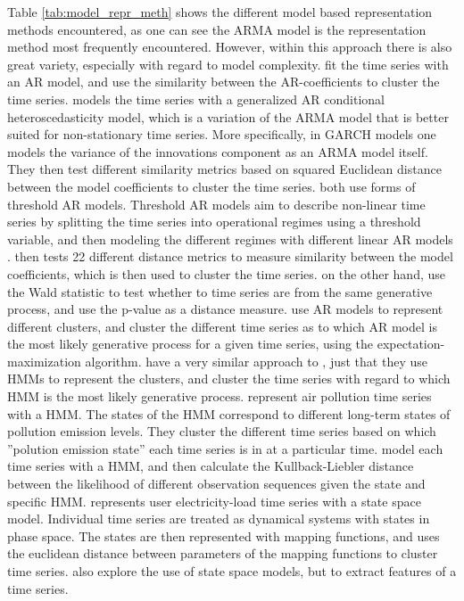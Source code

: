 Table \ref{tab:model_repr_meth} shows the different model based representation methods encountered, 
as one can see the ARMA model is the representation method most frequently encountered. 
However, within this approach there is also great variety, especially with regard to model complexity.
\textcite{shape_feat_mod_tsc_rfa, struct_damage_ar_fuzzy_c_means, ar_metric_trimmed_fuzzy_tsc_pm10, tsc_ar_metric_air_pollution} fit the time series with an AR model, and use the similarity between the AR-coefficients to cluster the time series. 
\textcite{garch_robust_tsc} models the time series with a generalized AR conditional heteroscedasticity model, which is a variation of the ARMA model that is better suited for non-stationary time series. 
More specifically, in GARCH models one models the variance of the innovations component as an ARMA model itself. 
They then test different similarity metrics based on squared Euclidean distance between the model coefficients to cluster the time series. 
\textcite{temporal_tsc_threshold_ar_models, fstar_hac_tsc} both use forms of threshold AR models. 
Threshold AR models aim to describe non-linear time series by splitting the time series into operational regimes using a threshold variable, and then modeling the different regimes with different linear AR models \cite{temporal_tsc_threshold_ar_models}. \textcite{temporal_tsc_threshold_ar_models} then tests 22 different distance metrics to measure similarity between the model coefficients, which is then used to cluster the time series. \textcite{fstar_hac_tsc} on the other hand, use the Wald statistic to test whether to time series are from the same generative process, and use the p-value as a distance measure.
\textcite{moar_mpl_tsc} use AR models to represent different clusters, and cluster the different time series as to which AR model is the most likely generative process for a given time series, using the expectation-maximization algorithm.
\textcite{mixture_gaussian_hmm} have a very similar approach to \textcite{moar_mpl_tsc}, just that they use HMMs to represent the clusters, and cluster the time series with regard to which HMM is the most likely generative process. 
\textcite{hmm_pm10_quantifying_impacts} represent air pollution time series with a HMM. 
The states of the HMM correspond to different long-term states of pollution emission levels.
They cluster the different time series based on which ''polution emission state'' each time series is in at a particular time. 
\textcite{multivariate_tsc_hmm} model each time series with a HMM, and then calculate the Kullback-Liebler distance between the likelihood of different observation sequences given the state and specific HMM. 
\textcite{load_tsc_state_space_model} represents user electricity-load time series with a state space model. Individual time series are treated as dynamical systems with states in phase space. 
The states are then represented with mapping functions, and uses the euclidean distance between parameters of the mapping functions to cluster time series. \textcite{stock_price_tsc_regr_trees_som} also explore the use of state space models, but to extract features of a time series.

